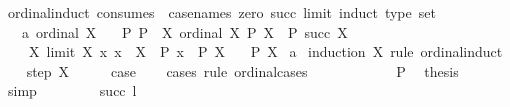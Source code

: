 \begin{isabellebody}
\begin{isamarkuptext}
\end{isamarkuptext}\isamarkuptrue%
\isamarkupfalse%
\ ordinal{\isacharunderscore}{\kern0pt}induct{}\ {\isacharbrackleft}{\kern0pt}consumes\ {}{\isacharcomma}{\kern0pt}\ case{\isacharunderscore}{\kern0pt}names\ zero\ succ\ limit{\isacharcomma}{\kern0pt}\ induct\ type{\isacharcolon}{\kern0pt}\ set{\isacharbrackright}{\kern0pt}{\isacharcolon}{\kern0pt}\isanewline
\ \ \ a{\isacharcolon}{\kern0pt}\ {\isachardoublequoteopen}ordinal\ X{\isachardoublequoteclose}\isanewline
\ \ \ P{\isacharcolon}{\kern0pt}\ {\isachardoublequoteopen}P\ {}{\isachardoublequoteclose}\ {\isachardoublequoteopen}{\isasymAnd}X{\isachardot}{\kern0pt}\ {\isasymlbrakk}ordinal\ X{\isacharsemicolon}{\kern0pt}\ P\ X{\isasymrbrakk}\ {\isasymLongrightarrow}\ P\ {\isacharparenleft}{\kern0pt}succ\ X{\isacharparenright}{\kern0pt}{\isachardoublequoteclose}\isanewline
\ \ \ \ {\isachardoublequoteopen}{\isasymAnd}X{\isachardot}{\kern0pt}\ {\isasymlbrakk}limit\ X{\isacharsemicolon}{\kern0pt}\ {\isasymAnd}x{\isachardot}{\kern0pt}\ x\ {\isasymin}\ X\ {\isasymLongrightarrow}\ P\ x{\isasymrbrakk}\ {\isasymLongrightarrow}\ P\ {\isacharparenleft}{\kern0pt}{\isasymUnion}X{\isacharparenright}{\kern0pt}{\isachardoublequoteclose}\isanewline
\ \ \ {\isachardoublequoteopen}P\ X{\isachardoublequoteclose}\isanewline
%
\isadelimproof
%
\endisadelimproof
%
\isatagproof
{}\isamarkupfalse%
\ a\isanewline
{}\isamarkupfalse%
\ {\isacharparenleft}{\kern0pt}induction\ X\ rule{\isacharcolon}{\kern0pt}\ ordinal{\isacharunderscore}{\kern0pt}induct{\isacharparenright}{\kern0pt}\isanewline
\ \ \isamarkupfalse%
\ {\isacharparenleft}{\kern0pt}step\ X{\isacharparenright}{\kern0pt}\isanewline
\ \ \isamarkupfalse%
\ \isamarkupfalse%
\ {\isacharquery}{\kern0pt}case\isanewline
\ \ \isamarkupfalse%
\ {\isacharparenleft}{\kern0pt}cases\ rule{\isacharcolon}{\kern0pt}\ ordinal{\isacharunderscore}{\kern0pt}cases{\isacharparenright}{\kern0pt}\isanewline
\ \ \ \ \isamarkupfalse%
\ {}\isanewline
\ \ \ \ \isamarkupfalse%
\ P{\isacharparenleft}{\kern0pt}{}{\isacharparenright}{\kern0pt}\ \isamarkupfalse%
\ {\isacharquery}{\kern0pt}thesis\ \isamarkupfalse%
\ simp\isanewline
\ \ \isamarkupfalse%
\isanewline
\ \ \ \ \isamarkupfalse%
\ {\isacharparenleft}{\kern0pt}succ\ l{\isacharparenright}{\kern0pt}\isanewline

\end{isabellebody}

